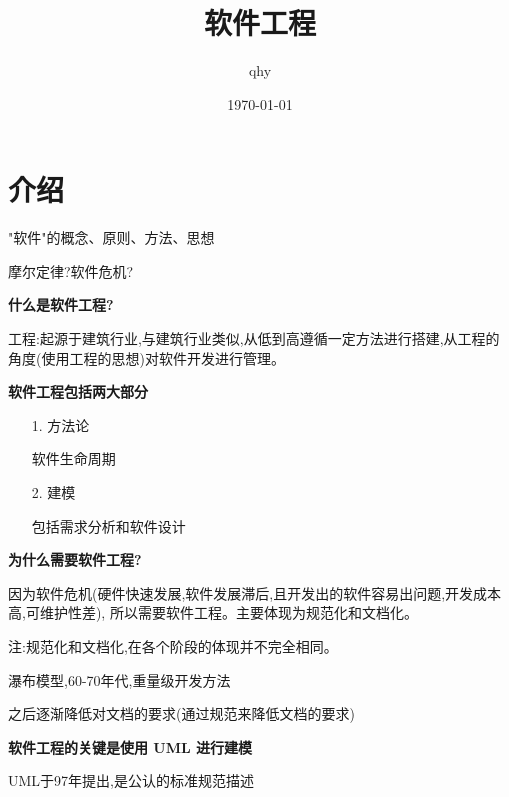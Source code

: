 \documentclass[UTF8,a4paper]{ctexart}
\author{ qhy }
\date{\today}
\title{软件工程}
\begin{document}
  \maketitle
  \tableofcontents
  \newpage

  \section{介绍}
  "软件"的概念、原则、方法、思想

  摩尔定律?软件危机?

  \textbf{什么是软件工程?}

  工程:起源于建筑行业,与建筑行业类似,从低到高遵循一定方法进行搭建,从工程的角度(使用工程的思想)对软件开发进行管理。

  \textbf{软件工程包括两大部分}
  \begin{itemize}
    \item [1.] 方法论

      软件生命周期
    \item [2.] 建模

      包括需求分析和软件设计
  \end{itemize}

  \textbf{为什么需要软件工程?}

  因为软件危机(硬件快速发展,软件发展滞后,且开发出的软件容易出问题,开发成本高,可维护性差),
  所以需要软件工程。主要体现为规范化和文档化。

  注:规范化和文档化,在各个阶段的体现并不完全相同。

  瀑布模型,60-70年代,重量级开发方法

  之后逐渐降低对文档的要求(通过规范来降低文档的要求)

  \textbf{软件工程的关键是使用 UML 进行建模}

  UML于97年提出,是公认的标准规范描述
\end{document}
